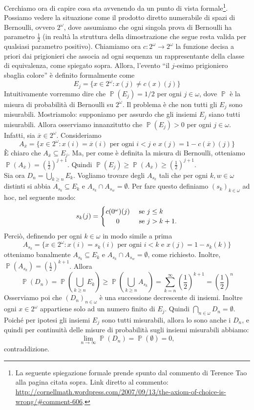 \documentclass[12pt,a4paper]{report}
\theoremstyle{definition}
\theoremstyle{num.custom-title}
\DeclareMathOperator{\PPP}{\mathbb{P}}
\DeclareMathOperator{\sse}{\subseteq}
\begin{document}
Cerchiamo ora di capire cosa sta avvenendo da un punto di vista formale\footnote{La seguente spiegazione formale prende spunto dal commento di Terence Tao alla pagina citata sopra. Link diretto al commento: \url{http://cornellmath.wordpress.com/2007/09/13/the-axiom-of-choice-is-wrong/\#comment-606}.}. Possiamo vedere la situazione come il prodotto diretto numerabile di spazi di Bernoulli, ovvero $2^\omega$, dove assumiamo che ogni singola prova di Bernoulli ha parametro $\frac{1}{2}$ (in realtà la struttura della dimostrazione che segue resta valida per qualsiasi parametro positivo). Chiamiamo ora $c: 2^\omega \to 2^\omega$ la funzione decisa a priori dai prigionieri che associa ad ogni sequenza un rappresentante della classe di equivalenza, come spiegato sopra. Allora, l'evento ``il $j$-esimo prigioniero sbaglia colore'' è definito formalmente come 
\[
E_j=\{x \in 2^\omega : x(j) \neq c(x)(j)\}
\]
Intuitivamente vorremmo dire che $\PPP(E_j)=1/2$ per ogni $j \in \omega$, dove $\PPP$ è la misura di probabilità di Bernoulli su $2^\omega$. Il problema è che non tutti gli $E_j$ sono misurabili. Mostriamolo: supponiamo per assurdo che gli insiemi $E_j$ siano tutti misurabili. Allora osserviamo innanzitutto che $\PPP(E_j)>0$ per ogni $j \in \omega$. Infatti, sia $\overline{x} \in 2^\omega$. Consideriamo 
\[
A_{\overline{x}}=\{x \in 2^\omega : x(i)=\overline{x}(i) \text{ per ogni $i<j$ e } x(j) = 1- c(\overline{x})(j)\}
\]
È chiaro che $A_{\overline{x}} \sse E_j$. Ma, per come è definita la misura di Bernoulli, otteniamo $\PPP(A_{\overline{x}})=(\frac{1}{2})^{j+1}$. Quindi $\PPP(E_j) \geq \PPP(A_{\overline{x}}) \geq (\frac{1}{2})^{j+1}$.\\
Sia ora $D_n=\bigcup_{k \geq n} E_k$. Vogliamo trovare degli $A_{s_k}$ tali che per ogni $k,w \in \omega$ distinti si abbia $A_{s_k} \sse E_k$ e $A_{s_k} \cap A_{s_w} = \emptyset$. Per fare questo definiamo $(s_k)_{k \in \omega}$ ad hoc, nel seguente modo:
\[
s_{k}(j)= 
  \begin{cases} 
      \hfill c(0^\omega)(j)		\hfill & \text{ se $j \leq k$} \\
      \hfill 0					\hfill & \text{ se $j>k+1$.} \\
  \end{cases}
\]
Perciò, definendo per ogni $k \in \omega$ in modo simile a prima
\[
A_{s_k}=\{x \in 2^\omega : x(i)=s_k(i) \text{ per ogni $i<k$ e } x(j) = 1- s_k(k)\}
\]
otteniamo banalmente $A_{s_k} \sse E_k$ e $A_{s_k} \cap A_{s_w} = \emptyset$, come richiesto. Inoltre, $\PPP(A_{s_k})=(\frac{1}{2})^{k+1}$.
Allora 
\[
\PPP(D_n) = \PPP\left(\bigcup_{k \geq n} E_k\right) \geq \PPP\left(\bigcup_{k \geq n} A_{s_k}\right) = \sum_{k=n}^\infty \left(\frac{1}{2}\right)^{k+1} = \left(\frac{1}{2}\right)^{n}
\]
Osserviamo poi che $(D_n)_{n \in \omega}$ è una successione decrescente di insiemi. Inoltre ogni $x \in 2^\omega$ appartiene solo ad un numero finito di $E_j$. Quindi $\bigcap_{n \in \omega} D_n = \emptyset$. Poiché per ipotesi gli insiemi $E_j$ sono tutti misurabili, allora lo sono anche i $D_n$, e quindi per continuità delle misure di probabilità sugli insiemi misurabili abbiamo:
\[
\lim_{n \to \infty} \PPP(D_n) = \PPP(\emptyset)=0,
\]
contraddizione.
\end{document}
